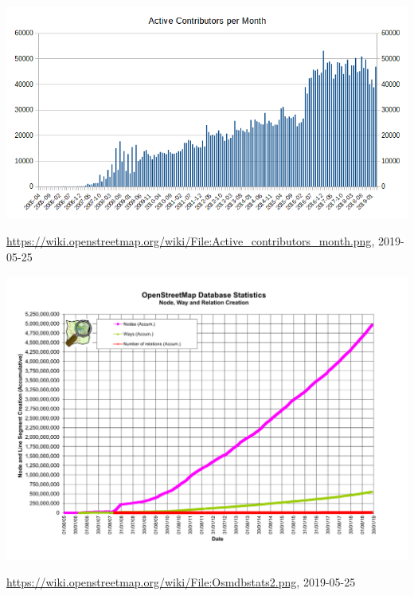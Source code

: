 \documentclass{beamer}
\begin{document}
	\begin{frame}
		\begin{center}
			\includegraphics[width=\textwidth,height=\textheight,keepaspectratio]{images/Active_contributors_month.png}
		\end{center}
		{\tiny \url{https://wiki.openstreetmap.org/wiki/File:Active_contributors_month.png}, 2019-05-25}
	\end{frame}
	
	\begin{frame}
		\begin{center}
			\includegraphics[width=\textwidth,height=\textheight,keepaspectratio]{images/Osmdbstats2.png}
		\end{center}
			{\tiny \url{https://wiki.openstreetmap.org/wiki/File:Osmdbstats2.png}, 2019-05-25}
	\end{frame}
	
\end{document}
